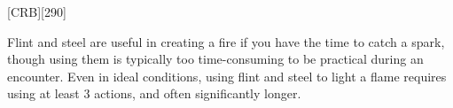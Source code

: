 
[CRB][290]

Flint and steel are useful in creating a fire if you have the time to catch a spark, 
though using them is typically too time-consuming to be practical during an encounter. 
Even in ideal conditions, using flint and steel to light a flame requires using at least 3 actions, 
and often significantly longer.


\vfill

\ItemBulk{-}
